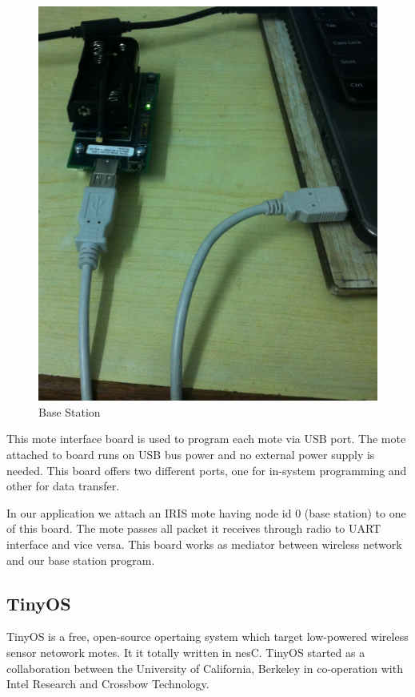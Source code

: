 \documentclass [a4paper,12pt]{book}
\begin{document}
\begin{figure}[!h]
\begin{center}
\includegraphics[scale=0.15]{images/18.JPG}
\caption{Base Station}
\label{bs}
\end{center}
\end{figure}

This mote interface board is used to program each mote via USB port. The mote attached to board runs on USB bus power and no external power supply is needed. This board offers two different ports, one for in-system programming and other for data transfer.

In our application we attach an IRIS mote having node id 0 (base station) to one of this board. The mote passes all packet it receives through radio to UART interface and vice versa. This board works as mediator between wireless network and our base station program. 

\subsection{TinyOS}
TinyOS is a free, open-source opertaing system which target low-powered wireless sensor netowork motes. It it totally written in nesC. TinyOS started as a collaboration between the University of California, Berkeley in co-operation with Intel Research and Crossbow Technology.
\end{document}
